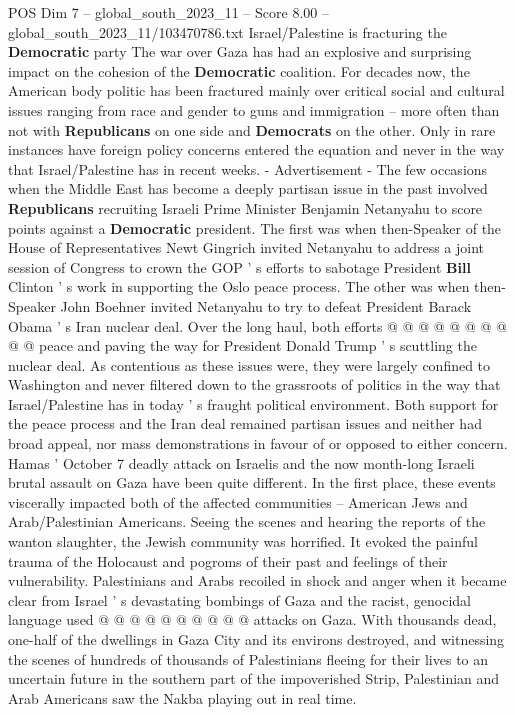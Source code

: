 \begin{textsample}{POS Dim 7 – global\_south\_2023\_11 – Score 8.00 – global\_south\_2023\_11/103470786.txt}  \label{ex:f7_pos_298}
Israel/Palestine is fracturing the \textbf{Democratic} party The war over Gaza has had an explosive and surprising impact on the cohesion of the \textbf{Democratic} coalition.
For decades now, the American body politic has been fractured mainly over critical social and cultural issues ranging from race and gender to guns and immigration -- more often than not with \textbf{Republicans} on one side and \textbf{Democrats} on the other.
Only in rare instances have foreign policy concerns entered the equation and never in the way that Israel/Palestine has in recent weeks. - Advertisement - The few occasions when the Middle East has become a deeply partisan issue in the past involved \textbf{Republicans} recruiting Israeli Prime Minister Benjamin Netanyahu to score points against a \textbf{Democratic} president.
The first was when then-Speaker of the House of Representatives Newt Gingrich invited Netanyahu to address a joint session of Congress to crown the GOP ' s efforts to sabotage President \textbf{Bill} Clinton ' s work in supporting the Oslo peace process.
The other was when then-Speaker John Boehner invited Netanyahu to try to defeat President Barack Obama ' s Iran nuclear deal.
Over the long haul, both efforts @ @ @ @ @ @ @ @ @ @ peace and paving the way for President Donald Trump ' s scuttling the nuclear deal.
As contentious as these issues were, they were largely confined to Washington and never filtered down to the grassroots of politics in the way that Israel/Palestine has in today ' s fraught political environment.
Both support for the peace process and the Iran deal remained partisan issues and neither had broad appeal, nor mass demonstrations in favour of or opposed to either concern.
Hamas ' October 7 deadly attack on Israelis and the now month-long Israeli brutal assault on Gaza have been quite different.
In the first place, these events viscerally impacted both of the affected communities -- American Jews and Arab/Palestinian Americans.
Seeing the scenes and hearing the reports of the wanton slaughter, the Jewish community was horrified.
It evoked the painful trauma of the Holocaust and pogroms of their past and feelings of their vulnerability.
Palestinians and Arabs recoiled in shock and anger when it became clear from Israel ' s devastating bombings of Gaza and the racist, genocidal language used @ @ @ @ @ @ @ @ @ @ attacks on Gaza.
With thousands dead, one-half of the dwellings in Gaza City and its environs destroyed, and witnessing the scenes of hundreds of thousands of Palestinians fleeing for their lives to an uncertain future in the southern part of the impoverished Strip, Palestinian and Arab Americans saw the Nakba playing out in real time.

\end{textsample}
